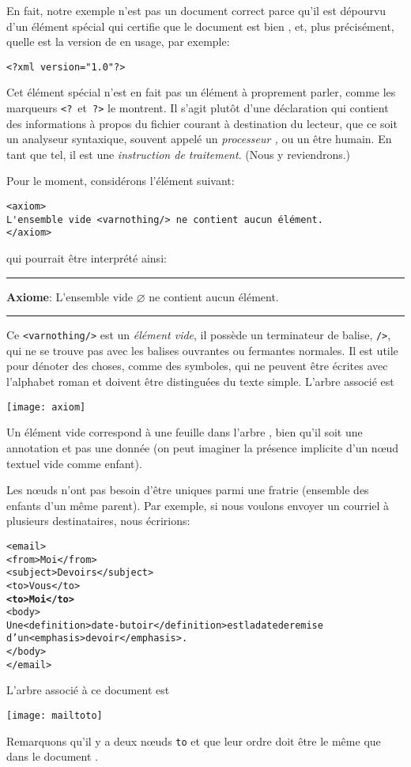 En fait, notre exemple n'est pas un document \XML correct parce qu'il
est dépourvu d'un élément spécial qui certifie que le document est
bien \XML, et, plus précisément, quelle est la version de \XML en
usage, par exemple:
\begin{verbatim}
<?xml version="1.0"?>
\end{verbatim}
Cet élément spécial n'est en fait pas un élément à proprement parler,
comme les marqueurs \texttt{<?}~et~\texttt{?>} le montrent. Il s'agit
plutôt d'une déclaration qui contient des informations à propos du
fichier courant à destination du lecteur, que ce soit un analyseur
syntaxique, souvent appelé un \emph{processeur \XML,} ou un être
humain. En tant que tel, il est une \emph{instruction de traitement}.
(Nous y reviendrons.)

Pour le moment, considérons l'élément suivant:
\begin{verbatim}
<axiom>
L'ensemble vide <varnothing/> ne contient aucun élément.
</axiom>
\end{verbatim}
qui pourrait être interprété ainsi:\\
\noindent\rule{\linewidth}{0.5pt}
\textsf{
\textbf{Axiome}: L'ensemble vide \(\varnothing\) ne contient aucun élément.}\\
\noindent\rule{\linewidth}{0.5pt}

Ce \verb|<varnothing/>| est un \emph{élément vide}, il possède un
terminateur de balise, \verb|/>|, qui ne se trouve pas avec les
balises ouvrantes ou fermantes normales. Il est utile pour dénoter des
choses, comme des symboles, qui ne peuvent être écrites avec
l'alphabet roman et doivent être distinguées du texte simple. L'arbre
associé est
\begin{center}
\texttt{[image: axiom]}
\end{center}
Un élément vide correspond à une feuille dans l'arbre \XML, bien qu'il
soit une annotation et pas une donnée (on peut imaginer la présence
implicite d'un n{\oe}ud textuel vide comme enfant).

Les n{\oe}uds n'ont pas besoin d'être uniques parmi une fratrie
(ensemble des enfants d'un même parent). Par exemple, si nous voulons
envoyer un courriel à plusieurs destinataires, nous écririons:
\begin{alltt}
\small<email>
  <from>Moi</from>
  <subject>Devoirs</subject>
  <to>Vous</to>
  \textbf{<to>Moi</to>}
  <body>
  Une <definition>date-butoir</definition> est la date de remise
d'un <emphasis>devoir</emphasis>.
  </body>
</email>
\end{alltt}
L'arbre \XML associé à ce document \XML est
\begin{center}
\texttt{[image: mailtoto]}
\end{center}
Remarquons qu'il y a deux n{\oe}uds \texttt{to} et que leur ordre doit
être le même que dans le document \XML.

